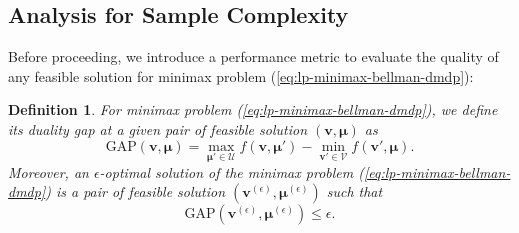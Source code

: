 \documentclass[12pt]{article}
\newtheorem{definition}{Definition}
\begin{document}

\subsection{Analysis for Sample Complexity}

\label{sec:alg-noupper-analysis-sample-complexity}

Before proceeding, we introduce a performance metric to evaluate the quality of any feasible solution for minimax problem (\ref{eq:lp-minimax-bellman-dmdp}):
\begin{definition}
    For minimax problem (\ref{eq:lp-minimax-bellman-dmdp}), we define its \textit{duality gap} at a given pair of feasible solution $(\boldsymbol{v},\boldsymbol{\mu})$ as
    \begin{equation*}
        \text{GAP}(\boldsymbol{v},\boldsymbol{\mu}) = \max_{\boldsymbol{\mu}' \in \mathcal{U}} f(\boldsymbol{v},\boldsymbol{\mu}') - \min_{\boldsymbol{v}' \in \mathcal{V}} f(\boldsymbol{v}',\boldsymbol{\mu}).
    \end{equation*}
    Moreover, an $\epsilon$-optimal solution of the minimax problem (\ref{eq:lp-minimax-bellman-dmdp}) is a pair of feasible solution $(\boldsymbol{v}^{(\epsilon)},\boldsymbol{\mu}^{(\epsilon)})$ such that
\begin{equation*}
    \text{GAP}(\boldsymbol{v}^{(\epsilon)},\boldsymbol{\mu}^{(\epsilon)}) \le \epsilon.
\end{equation*}
\end{definition}
\end{document}
